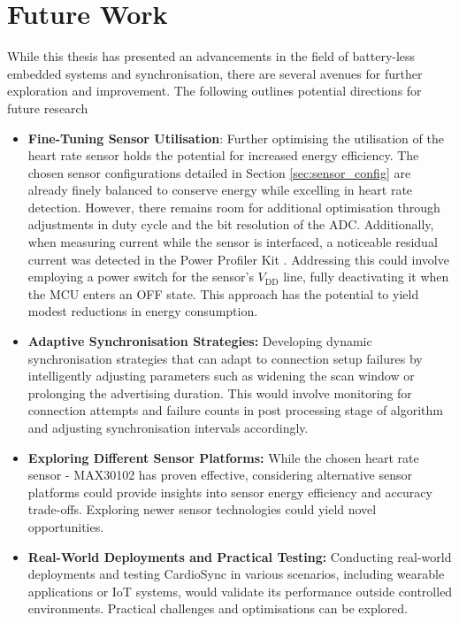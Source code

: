 \chapter{Future Work}
\label{chp:futurework}

While this thesis has presented an advancements in the field of battery-less embedded systems and synchronisation, there are several avenues for further exploration and improvement. The following outlines potential directions for future research

\begin{itemize}
    \item \textbf{Fine-Tuning Sensor Utilisation}: Further optimising the utilisation of the heart rate sensor holds the potential for increased energy efficiency. The chosen sensor configurations detailed in Section \ref{sec:sensor_config} are already finely balanced to conserve energy while excelling in heart rate detection. However, there remains room for additional optimisation through adjustments in duty cycle and the bit resolution of the ADC. Additionally, when measuring current while the sensor is interfaced, a noticeable residual current was detected in the Power Profiler Kit \cite{2023Power}. Addressing this could involve employing a power switch for the sensor's $V_\text{DD}$ line, fully deactivating it when the MCU enters an OFF state. This approach has the potential to yield modest reductions in energy consumption.

    \item \textbf{Adaptive Synchronisation Strategies:} Developing dynamic synchronisation strategies that can adapt to connection setup failures by intelligently adjusting parameters such as widening the scan window or prolonging the advertising duration. This would involve monitoring for connection attempts and failure counts in post processing stage of algorithm and adjusting synchronisation intervals accordingly.

    \item \textbf{Exploring Different Sensor Platforms: }While the chosen heart rate sensor - MAX30102 has proven effective, considering alternative sensor platforms could provide insights into sensor energy efficiency and accuracy trade-offs. Exploring newer sensor technologies could yield novel opportunities.

    \item \textbf{Real-World Deployments and Practical Testing:} Conducting real-world deployments and testing CardioSync in various scenarios, including wearable applications or IoT systems, would validate its performance outside controlled environments. Practical challenges and optimisations can be explored.
\end{itemize}
